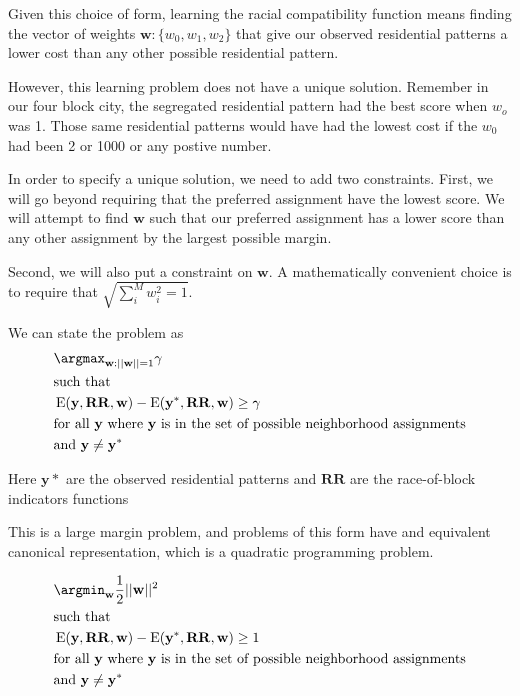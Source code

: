 Given this choice of form, learning the racial compatibility function
means finding the vector of weights $\mathbf{w}: \{w_0, w_1, w_2\}$ that give our observed residential patterns a lower
cost than any other possible residential pattern.

However, this learning problem does not have a unique
solution. Remember in our four block city, the segregated residential
pattern had the best score when $w_o$ was 1. Those same residential
patterns would have had the lowest cost if the $w_0$ had been 2 or
1000 or any postive number.

In order to specify a unique solution, we need to add two
constraints. First, we will go beyond requiring that the preferred
assignment have the lowest score. We will attempt to find $\mathbf{w}$
such that our preferred assignment has a lower score than any other
assignment by the largest possible margin. 

Second, we will also put a constraint on $\mathbf{w}$. A
mathematically convenient choice is to require that $\sqrt{\sum_i^M w_i^2 = 1}$.

We can state the problem as 
%
\begin{align*}
&\argmax_{\mathbf{w}:||\mathbf{w}||=1} \mathbf{\gamma} \\
&\text{such that} \\
&\operatorname{E}(\mathbf{y}, \mathbf{RR}, \mathbf{w})
- \operatorname{E}(\mathbf{y}^*, \mathbf{RR}, \mathbf{w}) \geq \gamma\\ 
&\text{for all } \mathbf{y} \text{ where } \mathbf{y} \text{ is in the set of
  possible neighborhood assignments}\\
&\text{and } \mathbf{y} \neq \mathbf{y}^*
\end{align*}
%

Here $\mathbf{y}*$ are the observed residential patterns and $\mathbf{RR}$
are the race-of-block indicators functions

This is a large margin problem, and problems of this form have and
equivalent canonical representation, which is a quadratic programming
problem.

%
\begin{align*}
&\argmin_{\mathbf{w}} \frac{1}{2}||\mathbf{w}||^2 \\
&\text{such that} \\
&\operatorname{E}(\mathbf{y}, \mathbf{RR}, \mathbf{w})
- \operatorname{E}(\mathbf{y}^*, \mathbf{RR}, \mathbf{w}) \geq 1 \\ 
&\text{for all } \mathbf{y} \text{ where } \mathbf{y} \text{ is in the set of
  possible neighborhood assignments}\\
&\text{and } \mathbf{y} \neq \mathbf{y}^*
\end{align*}


